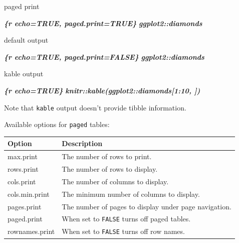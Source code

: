 \documentclass[
  a4paper,
  twoside,
  openright]{book}
\newenvironment{Shaded}{\begin{snugshade}}{\end{snugshade}}
\newcommand{\InformationTok}[1]{\textcolor[rgb]{0.56,0.35,0.01}{\textbf{\textit{#1}}}}
\newcommand{\NormalTok}[1]{#1}
\theoremstyle{definition}
\theoremstyle{definition}
\theoremstyle{definition}
\theoremstyle{definition}
\theoremstyle{remark}
\begin{document}
\begin{Shaded}
\begin{Highlighting}[]
\NormalTok{paged print}

\InformationTok{\textasciigrave{}\textasciigrave{}\textasciigrave{}\{r echo=TRUE, paged.print=TRUE\}}
\InformationTok{ggplot2::diamonds}
\InformationTok{\textasciigrave{}\textasciigrave{}\textasciigrave{}}

\NormalTok{default output}

\InformationTok{\textasciigrave{}\textasciigrave{}\textasciigrave{}\{r echo=TRUE, paged.print=FALSE\}}
\InformationTok{ggplot2::diamonds}
\InformationTok{\textasciigrave{}\textasciigrave{}\textasciigrave{}}

\NormalTok{kable output}

\InformationTok{\textasciigrave{}\textasciigrave{}\textasciigrave{}\{r echo=TRUE\}}
\InformationTok{knitr::kable(ggplot2::diamonds[1:10, ])}
\InformationTok{\textasciigrave{}\textasciigrave{}\textasciigrave{}}
\end{Highlighting}
\end{Shaded}

Note that \texttt{kable} output doesn't provide tibble information.

Available options for \texttt{paged} tables:

\begin{longtable}[]{@{}
  >{\raggedright\arraybackslash}p{}
  >{\raggedright\arraybackslash}p{}@{}}
\toprule\noalign{}
\begin{minipage}[b]{\linewidth}\raggedright
Option
\end{minipage} & \begin{minipage}[b]{\linewidth}\raggedright
Description
\end{minipage} \\
\midrule\noalign{}
\endhead
\bottomrule\noalign{}
\endlastfoot
max.print & The number of rows to print. \\
rows.print & The number of rows to display. \\
cols.print & The number of columns to display. \\
cols.min.print & The minimum number of columns to display. \\
pages.print & The number of pages to display under page navigation. \\
paged.print & When set to \texttt{FALSE} turns off paged tables. \\
rownames.print & When set to \texttt{FALSE} turns off row names. \\
\end{longtable}
\end{document}
